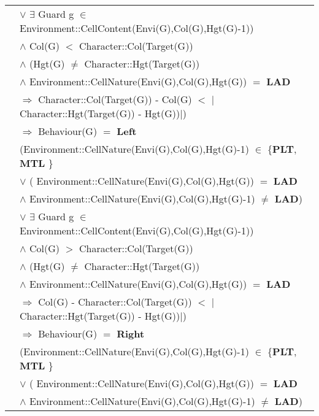 \documentclass[8pt]{article}
\begin{document}
{\begin{longtable}{rl}
  & \quad\quad\quad\quad $\lor$ $\exists$ \textrm{Guard} g $\in$ \textrm{Environment::CellContent(Envi(G),Col(G),Hgt(G)-1)}) \\
  & \quad\quad $\land$ \textrm{Col(G)} $<$ \textrm{Character::Col(Target(G))} \\
  & \quad\quad $\land$ (\textrm{Hgt(G)} $\neq$ \textrm{Character::Hgt(Target(G))} \\
  & \quad\quad\quad\quad $\land$ \textrm{Environment::CellNature(Envi(G),Col(G),Hgt(G))} $=$ \textbf{LAD}\\
  & \quad\quad\quad\quad $\Rightarrow$ \textrm{Character::Col(Target(G)) - Col(G)} $<$ $|$\textrm{Character::Hgt(Target(G)) - Hgt(G)})$|$) \\
  & \quad\quad $\Rightarrow$ \textrm{Behaviour(G)} $=$ \textbf{Left} \\ 
  & (\textrm{Environment::CellNature(Envi(G),Col(G),Hgt(G)-1)} $\in$ \{\textbf{PLT}, \textbf{MTL}  \} \\
  & \quad\quad\quad\quad $\lor$ ( \textrm{Environment::CellNature(Envi(G),Col(G),Hgt(G))} $=$ \textbf{LAD} \\
  & \quad\quad\quad\quad\quad\quad $\land$ \textrm{Environment::CellNature(Envi(G),Col(G),Hgt(G)-1)} $\neq$ \textbf{LAD}) \\
  & \quad\quad\quad\quad $\lor$ $\exists$ \textrm{Guard} g $\in$ \textrm{Environment::CellContent(Envi(G),Col(G),Hgt(G)-1)}) \\
  & \quad\quad $\land$ \textrm{Col(G)} $>$ \textrm{Character::Col(Target(G))} \\
  & \quad\quad $\land$ (\textrm{Hgt(G)} $\neq$ \textrm{Character::Hgt(Target(G))} \\
  & \quad\quad\quad\quad $\land$ \textrm{Environment::CellNature(Envi(G),Col(G),Hgt(G))} $=$ \textbf{LAD}\\
  & \quad\quad\quad\quad $\Rightarrow$ \textrm{Col(G) - Character::Col(Target(G))} $<$ $|$\textrm{Character::Hgt(Target(G)) - Hgt(G)})$|$) \\
  & \quad\quad $\Rightarrow$ \textrm{Behaviour(G)} $=$ \textbf{Right} \\
  & (\textrm{Environment::CellNature(Envi(G),Col(G),Hgt(G)-1)} $\in$ \{\textbf{PLT}, \textbf{MTL}  \} \\
  & \quad\quad\quad\quad $\lor$ ( \textrm{Environment::CellNature(Envi(G),Col(G),Hgt(G))} $=$ \textbf{LAD} \\
  & \quad\quad\quad\quad\quad\quad $\land$ \textrm{Environment::CellNature(Envi(G),Col(G),Hgt(G)-1)} $\neq$ \textbf{LAD}) \\

\end{longtable}}
\end{document}
